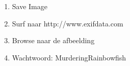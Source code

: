 \begin{enumerate}
  \item Save Image
  \item Surf naar http://www.exifdata.com
  \item Browse naar de afbeelding
  \item Wachtwoord: MurderingRainbowfish
\end{enumerate}